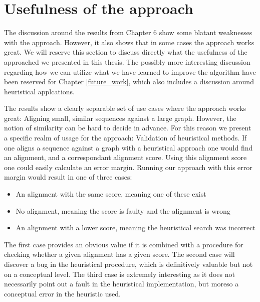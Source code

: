 \documentclass[thesis.tex]{subfiles}
\begin{document}
\section{Usefulness of the approach}
The discussion around the results from Chapter 6 show some blatant weaknesses with the approach. However, it also shows that in some cases the approach works great. We will reserve this section to discuss directly what the usefulness of the approached we presented in this thesis. The possibly more interesting discussion regarding how we can utilize what we have learned to improve the algorithm have been reserved for Chapter \ref{future_work}, which also includes a discussion around heuristical applcations.\\
\par\noindent
The results show a clearly separable set of use cases where the approach works great: Aligning small, similar sequences against a large graph. However, the notion of similarity can be hard to decide in advance. For this reason we present a specific realm of usage for the approach: Validation of heuristical methods. If one aligns a sequence against a graph with a heuristical approach one would find an alignment, and a correspondant alignment score. Using this alignment score one could easily calculate an error margin. Running our approach with this error margin would result in one of three cases:
\begin{itemize}
  \item An alignment with the same score, meaning one of these exist
  \item No alignment, meaning the score is faulty and the alignment is wrong
  \item An alignment with a lower score, meaning the heuristical search was incorrect
\end{itemize}
The first case provides an obvious value if it is combined with a procedure for checking whether a given alignment has a given score. The second case will discover a bug in the heuristical procedure, which is definitively valuable but not on a conceptual level. The third case is extremely interesting as it does not necessarily point out a fault in the heuristical implementation, but moreso a conceptual error in the heuristic used.
\end{document}
